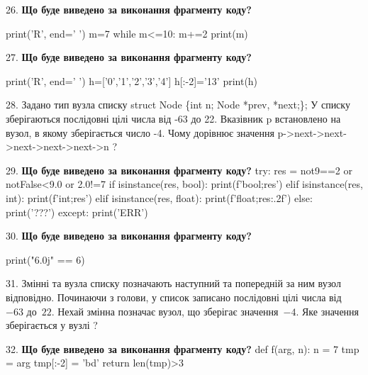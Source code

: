 \documentclass[11pt]{article}
\begin{document}
26. \textbf{Що буде виведено за виконання фрагменту коду?}

print('R', end=' ')
m=7
while m<=10:
    m+=2
print(m)

\par\vspace{5mm}

27. \textbf{Що буде виведено за виконання фрагменту коду?}

print('R', end=' ')
h=['0','1','2','3','4']
h[:-2]='13'
print(h)

\par\vspace{5mm}

28. 
Задано тип вузла списку
struct Node \{int n; Node *prev, *next;\};
У списку зберігаються послідовні цілі числа від -63 до 22. Вказівник p встановлено на вузол, в якому зберігається число -4.
Чому дорівнює значення p->next->next->next->next->next->n ?\par\vspace{5mm}

29. \textbf{Що буде виведено за виконання фрагменту коду?}
try:
    res = not9==2 or notFalse<9.0 or 2.0!=7
    if isinstance(res, bool):
        print(f'bool;{res}')
    elif isinstance(res, int):
        print(f'int;{res}')
    elif isinstance(res, float):
        print(f'float;{res:.2f}')
    else:
        print('???')
except:
    print('ERR')
\par\vspace{5mm}

30. \textbf{Що буде виведено за виконання фрагменту коду?}

print("6.0j" == 6)
\par\vspace{5mm}

31. 
Змінні  та  вузла списку позначають наступний та попередній за ним вузол відповідно. Починаючи з голови, у список записано послідовні цілі числа від~$-63$ до~$22$. Нехай змінна  позначає вузол, що зберігає значення~$-4$.
Яке значення зберігається у вузлі  ?
\par\vspace{5mm}

32. \textbf{Що буде виведено за виконання фрагменту коду?}
def f(arg, n):
    n = 7
    tmp = arg
    tmp[:-2] = 'bd'
    return len(tmp)>3
\end{document}
